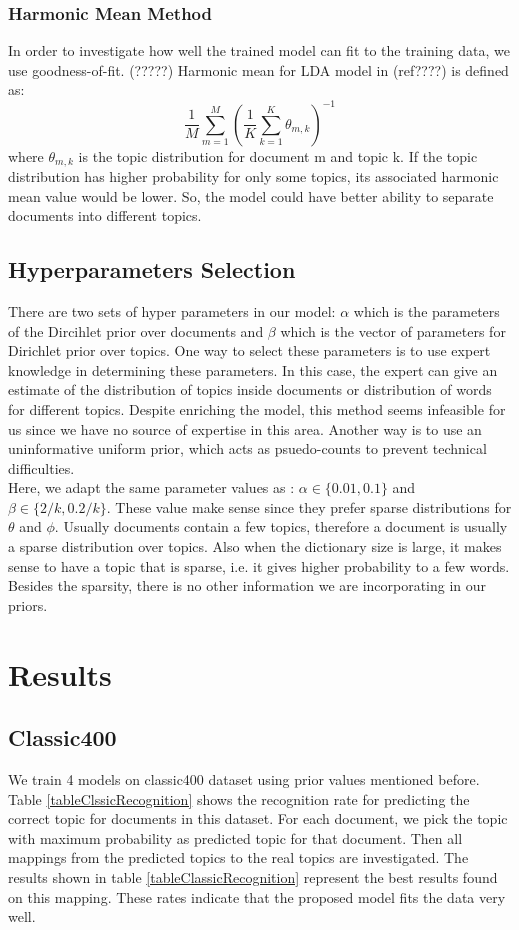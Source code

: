 \documentclass[twoside,12pt]{article}
\begin{document}
\subsubsection{Harmonic Mean Method}
In order to investigate how well the trained model can fit to the training data, we use goodness-of-fit. (?????) Harmonic mean for LDA model in (ref????) is defined as:
\begin{equation}
\frac{1}{M}\sum_{m=1}^{M}(\frac{1}{K}\sum_{k=1}^{K}\theta_{m,k})^{-1}
\end{equation}
where $\theta_{m,k}$ is the topic distribution for document m and topic k. If the topic distribution has higher probability for only some topics, its associated harmonic mean value would be lower. So, the model could have better ability to separate documents into different topics.


\subsection{Hyperparameters Selection}
There are two sets of hyper parameters in our model: $\alpha$ which is the parameters of the Dircihlet prior over documents and $\beta$ which is the vector of parameters for Dirichlet prior over topics. One way to select these parameters is to use expert knowledge in determining these parameters. In this case, the expert can give an estimate of the distribution of topics inside documents or distribution of words for different topics. Despite enriching the model, this method seems infeasible for us since we have no source of expertise in this area. Another way is to use an uninformative uniform prior, which acts as psuedo-counts to prevent technical difficulties.\\
Here, we adapt the same parameter values as \cite{fastlda}: $\alpha \in \{0.01,0.1\}$ and $\beta\in\{2/k,0.2/k\}$. These value make sense since they prefer sparse distributions for $\theta$ and $\phi$. Usually documents contain a few topics, therefore a document is usually a sparse distribution over topics. Also when the dictionary size is large, it makes sense to have a topic that is sparse, i.e. it gives higher probability to a few words. Besides the sparsity, there is no other information we are incorporating in our priors. 

\section{Results}


\subsection{Classic400}
We train 4 models on classic400 dataset using prior values mentioned before. Table \ref{tableClssicRecognition} shows the recognition rate for predicting the correct topic for documents in this dataset. For each document, we pick the topic with maximum probability as predicted topic for that document. Then all mappings from the predicted topics to the real topics are investigated. The results shown in table \ref{tableClassicRecognition} represent the best results found on this mapping. These rates indicate that the proposed model fits the data very well.
\end{document}
